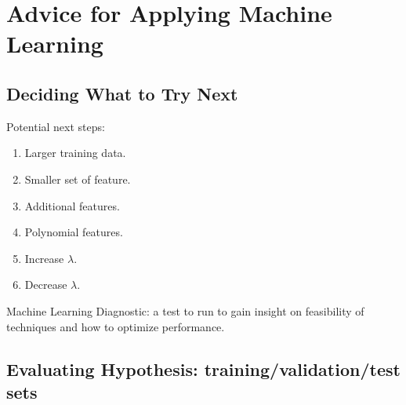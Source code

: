 \section{Advice for Applying Machine Learning}

\subsection{Deciding What to Try Next}
    Potential next steps:
    \begin{enumerate}
        \item Larger training data.
        \item Smaller set of feature.
        \item Additional features.
        \item Polynomial features.
        \item Increase $\lambda$.
        \item Decrease $\lambda$. 
    \end{enumerate}

    Machine Learning Diagnostic: a test to run to gain insight on feasibility of techniques and how to optimize performance. 

\subsection{Evaluating Hypothesis: training/validation/test sets}
